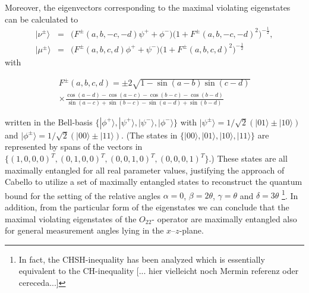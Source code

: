 \documentclass[prl,showpacs,showkeys,amsfonts,amsmath,twocolumn]{revtex4}
\newcommand{\ket}[1]{|#1\rangle}
\begin{document}
Moreover, the eigenvectors corresponding to the maximal violating
eigenstates can be calculated to
\begin{eqnarray}
  \ket{\nu^\pm}&=&\big(F^\pm(a,b,-c,-d) \psi^+ +
  \phi^-\big)\big(1+F^\pm(a,b,-c,-d)^2\big)^{-\frac{1}{2}},\nonumber\\
  \ket{\mu^\pm}&=&\big(F^\pm(a,b,c,d) \phi^+ +
  \psi^-\big)\big(1+F^\pm(a,b,c,d)^2\big)^{-\frac{1}{2}}
\end{eqnarray}
with
\begin{small}
\begin{multline*}F^\pm(a,b,c,d)=\pm 2\sqrt{1-\sin(a-b)\sin(c-d)}\\
\times \frac{\cos(a-d)-\cos(a-c)-\cos(b-c)-\cos(b-d)}{\sin(a-c)+\sin(b-c)-\sin(a-d)
  +\sin(b-d)}
\end{multline*}
\end{small}
written in the Bell-basis
$\{\ket{\phi^+},\ket{\psi^+},\ket{\psi^-},\ket{\phi^-}\}$ with
$\ket{\psi^\pm} = 1/\sqrt{2}(\ket{01} \pm \ket{10})$ and
$\ket{\phi^\pm} = 1/\sqrt{2}(\ket{00} \pm \ket{11})$.
(The states in
$\{\ket{00},\ket{01},\ket{10},\ket{11}\}$ are represented by spans of the vectors in
$\{(1,0,0,0)^T,(0,1,0,0)^T,(0,0,1,0)^T,(0,0,0,1)^T\}$.)
These states are all maximally entangled for all real parameter values, justifying the approach of
Cabello \cite{cabello-2003a} to utilize a set of
maximally entangled states to
reconstruct the quantum bound for the setting of the relative angles
$\alpha=0$, $\beta=2\theta$, $\gamma=\theta$ and $\delta=3\theta$ \footnote{In fact, the
  CHSH-inequality has been analyzed which is essentially equivalent to
  the CH-inequality [... hier  vielleicht noch Mermin referenz oder cereceda...]}. In addition, from the
particular form of the eigenstates we can conclude that the maximal
violating eigenstates of the $O_{22}$- operator are maximally
entangled also for general measurement angles lying in the $x$--$z$-plane.
\end{document}
